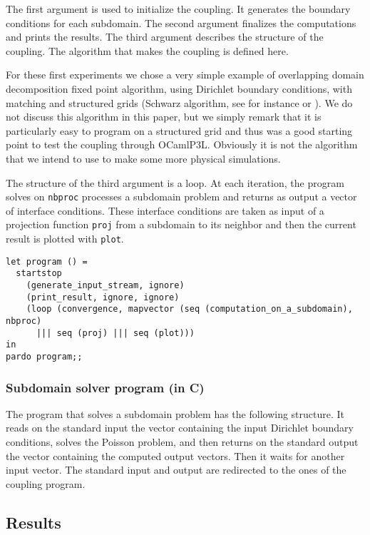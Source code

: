 The first argument is used to initialize the coupling. It generates
the boundary conditions for each subdomain. The second argument
finalizes the computations and prints the results. The third argument
describes the structure of the coupling. The algorithm that makes the
coupling is defined here. 

For these first experiments we chose a very simple example of overlapping
domain decomposition fixed point algorithm, using Dirichlet boundary
conditions, with matching and structured grids (Schwarz algorithm, see for
instance \cite{MR1857663} or \cite{MR95b:65147}). We do not discuss this
algorithm in this paper, but we simply remark that it is particularly easy to
program on a structured grid and thus was a good starting point to test the
coupling through OCamlP3L. Obviously it is not the algorithm that we intend to
use to make some more physical simulations.

The structure of the third argument is a loop. At each iteration, the program
solves on {\tt nbproc} processes a subdomain problem and returns as output a
vector of interface conditions. These interface conditions are taken as input
of a projection function {\tt proj} from a subdomain to its neighbor and then
the current result is plotted with {\tt plot}.
\begin{verbatim}
let program () = 
  startstop
    (generate_input_stream, ignore)
    (print_result, ignore, ignore)
    (loop (convergence, mapvector (seq (computation_on_a_subdomain), nbproc)
      ||| seq (proj) ||| seq (plot)))
in
pardo program;;
\end{verbatim}

\subsubsection*{Subdomain solver program (in C)}

The program that solves a subdomain problem has the following structure. It
reads on the standard input the vector containing the input Dirichlet boundary
conditions, solves the Poisson problem, and then returns on the standard output
the vector containing the computed output vectors. Then it waits for another
input vector.
The standard input and
output are redirected to the ones of the coupling program.

\subsection{Results}
\label{ss:dd-not}


